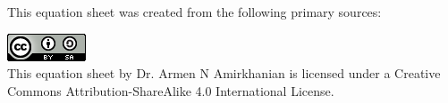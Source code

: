 \documentclass[notitlepage,letterpaper,fleqn]{report}
\begin{document}
\vspace{1.5in}

This equation sheet was created from the following primary sources:
\begingroup
\renewcommand{\section}[2]{}%
\renewcommand{\chapter}[2]{}%


\endgroup

\begin{center}
\includegraphics[scale=0.6]{88x31.png}\\
This equation sheet by Dr. Armen N Amirkhanian is licensed under a Creative Commons Attribution-ShareAlike 4.0 International License.
\end{center}
\end{document}
